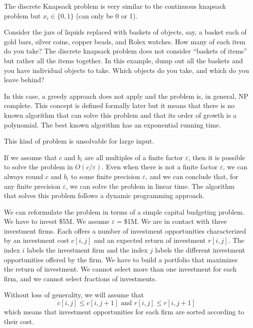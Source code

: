 \documentclass[justified, sixbynine]{tufte-book}
\theoremstyle{plain}%
\newtheorem * {corollary}{Corollary}
\theoremstyle{definition}
\theoremstyle{remark}
\newtheorem * {remark}{Remark}
\newtheorem * {note}{Note}
\begin{document}
\begin{fullwidth}
The discrete Knapsack problem is very similar to the continuous knapsack
problem but $x_i\in \{0, 1\}$ (can only be 0 or 1).

Consider the jars of liquids replaced with baskets of objects, say, a basket each of gold bars, silver coins, copper beads, and Rolex watches.  How many of each item do you take?  The discrete knapsack problem does not consider ``baskets of items'' but rather all the items together.  In this example, dump out all the baskets and you have individual objects to take.  Which objects do you take, and which do you leave behind?

In this case, a greedy approach does not apply and the problem is, in general, 
NP complete. This concept is defined formally later but it means that there is no known algorithm that can solve this problem and that its order of growth is a polynomial. The best known algorithm has an exponential running time.

This kind of problem is unsolvable for large input.

If we assume that $c$ and $b_i$ are all multiples of a finite factor $\varepsilon$, then it is possible to solve the problem in $O(c/\varepsilon )$.
Even when there is not a finite factor $\varepsilon$, 
we can always round $c$ and $b_i$ to some finite precision $\varepsilon$, 
and we can conclude that, for any finite precision $\varepsilon$, we can
solve the problem in linear time. The algorithm that solves this problem
follows a dynamic programming approach.

We can reformulate the problem in terms of a simple capital budgeting
problem. We have to invest \$5M. We assume $\varepsilon =$\$1M. We are in
contact with three investment firms. Each offers a number of investment
opportunities characterized by an investment cost $c[i, j]$ and an expected
return of investment $r[i, j]$. The index $i$ labels the investment firm and
the index $j$ labels the different investment opportunities offered by the
firm. We have to build a portfolio that maximizes the return of investment.
We cannot select more than one investment for each firm, and we cannot select
fractions of investments.

Without loss of generality, we will assume that
\begin{equation}
c[i, j]\leq c[i, j+1]\text{ and }r[i, j]\leq r[i, j+1]
\end{equation}
which means that investment opportunities for each firm are sorted according
to their cost.


\end{fullwidth}
\end{document}
